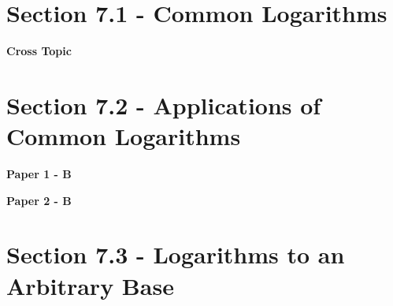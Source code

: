 \documentclass[12pt, a4paper]{article}
\begin{document}
\section*{Section 7.1 - Common Logarithms \NF}\label{section:4-7-1}

\textbf{Cross Topic}
\begin{enumx}[label=\arabic*.,start=1]
\item {}\label{DSE2019-CoreP2-Q32} 
\end{enumx}




\section*{Section 7.2 - Applications of Common Logarithms \NF}\label{section:4-7-2}

\textbf{Paper 1 - B}
\begin{enumx}[label=\arabic*.,start=2]
\item {}\label{DSE2012S-CoreP1-Q17} 
\end{enumx}
\textbf{Paper 2 - B}
\begin{enumx}[label=\arabic*.,start=3]
\item {}\label{DSE2012S-CoreP2-Q32} 
\item {}\label{DSE2012P-CoreP2-Q37} 
\item {}\label{DSE2014-CoreP2-Q33} 
\item {}\label{DSE2022-CoreP2-Q31} 
\end{enumx}




\section*{Section 7.3 - Logarithms to an Arbitrary Base \NF}\label{section:4-7-3}
\end{document}
